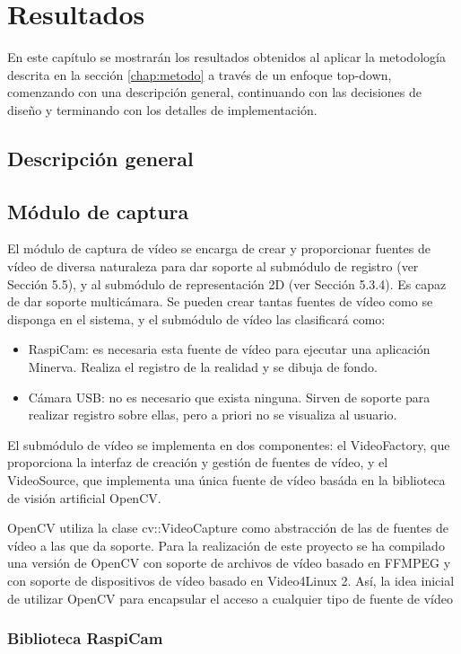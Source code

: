 \chapter{Resultados}
\label{chap:resultados}




En este capítulo se mostrarán los resultados obtenidos al aplicar la metodología descrita en la sección \ref{chap:metodo} a través de un enfoque top-down, comenzando con una descripción general, continuando con las decisiones
de diseño y terminando con los detalles de implementación. 

\section{Descripción general}
\section{Módulo de captura}
El módulo de captura de vídeo se encarga de crear y proporcionar fuentes de vídeo de diversa naturaleza para dar soporte al submódulo de registro (ver Sección 5.5), y al submódulo de representación 2D (ver Sección 5.3.4).
Es capaz de dar soporte multicámara. Se pueden crear tantas fuentes de vídeo como se disponga en el sistema, y el submódulo de vídeo las clasificará como: 
\begin{itemize}
\item RaspiCam: es necesaria esta fuente de vídeo para ejecutar una aplicación Minerva. Realiza el registro de la realidad y se dibuja de fondo.
\item Cámara USB: no es necesario que exista ninguna. Sirven de soporte para realizar registro sobre ellas, pero a priori no se visualiza al usuario.
\end{itemize}

El submódulo de vídeo se implementa en dos componentes: el VideoFactory, que proporciona la interfaz de creación y gestión de fuentes de vídeo, y el VideoSource, que implementa una única fuente de vídeo basáda en la biblioteca de visión artificial OpenCV.

OpenCV utiliza la clase cv::VideoCapture como abstracción de las de fuentes de vídeo a las que da soporte.
Para la realización de este proyecto se ha compilado una versión de OpenCV con soporte de archivos de vídeo basado en FFMPEG y con soporte de dispositivos de vídeo basado en Video4Linux 2. Así, la idea inicial de utilizar OpenCV para encapsular el acceso a cualquier tipo de fuente de vídeo 
\subsection{Biblioteca RaspiCam}



